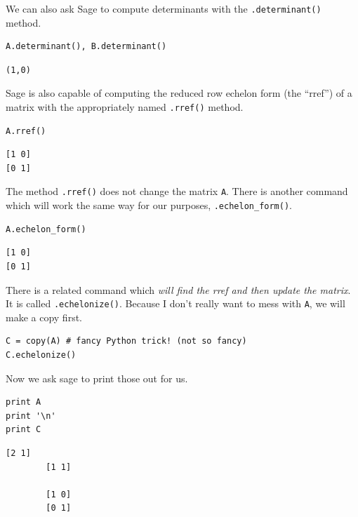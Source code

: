 \documentclass[10pt,]{book}
\theoremstyle{plain}
\theoremstyle{definition}
\numberwithin{equation}{section}
\begin{document}
      We can also ask Sage to compute determinants with the \verb?.determinant()?
      method.
\begin{lstlisting}[style=sageinput]
A.determinant(), B.determinant()
\end{lstlisting}
\begin{lstlisting}[style=sageoutput]
(1,0)
\end{lstlisting}
\par

      Sage is also capable of computing the reduced row echelon form
      (the ``rref'') of a matrix with the appropriately named \verb?.rref()?
      method.
\begin{lstlisting}[style=sageinput]
A.rref()
\end{lstlisting}
\begin{lstlisting}[style=sageoutput]
[1 0]
[0 1]
\end{lstlisting}
\par

      The method \verb?.rref()? does not change the matrix \verb?A?. There is
      another command which will work the same way for our purposes,
      \verb?.echelon_form()?.
\begin{lstlisting}[style=sageinput]
A.echelon_form()
\end{lstlisting}
\begin{lstlisting}[style=sageoutput]
[1 0]
[0 1]
\end{lstlisting}
\par

      There is a related command which \emph{will find the rref and then update the
      matrix}. It is called \verb?.echelonize()?.
      Because I don't really want to mess with \verb?A?, we will
      make a copy first.
\begin{lstlisting}[style=sageinput]
C = copy(A) # fancy Python trick! (not so fancy)
C.echelonize()
\end{lstlisting}
\par

      Now we ask sage to print those out for us.
\begin{lstlisting}[style=sageinput]
print A
print '\n'
print C
\end{lstlisting}
\begin{lstlisting}[style=sageoutput]
        [2 1]
        [1 1]

        [1 0]
        [0 1]
\end{lstlisting}
\par
\end{document}
